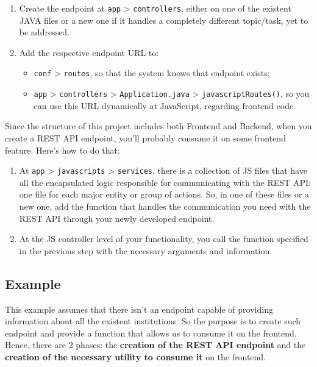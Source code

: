 \documentclass[
  11pt,
]{krantz}
\providecommand{\tightlist}{%
  \setlength{\itemsep}{0pt}\setlength{\parskip}{0pt}}
\begin{document}
\begin{enumerate}
\def\labelenumi{\arabic{enumi}.}
\item
  Create the endpoint at \texttt{app} \textgreater{} \texttt{controllers}, either on one of the existent JAVA files or a new one if it handles a completely different topic/task, yet to be addressed.
\item
  Add the respective endpoint URL to:

  \begin{itemize}
  \tightlist
  \item
    \texttt{conf} \textgreater{} \texttt{routes}, so that the system knows that endpoint exists;
  \item
    \texttt{app} \textgreater{} \texttt{controllers} \textgreater{} \texttt{Application.java} \textgreater{} \texttt{javascriptRoutes()}, so you can use this URL dynamically at JavaScript, regarding frontend code.
  \end{itemize}
\end{enumerate}

Since the structure of this project includes both Frontend and Backend, when you create a REST API endpoint, you'll probably consume it on some frontend feature. Here's how to do that:

\begin{enumerate}
\def\labelenumi{\arabic{enumi}.}
\item
  At \texttt{app} \textgreater{} \texttt{javascripts} \textgreater{} \texttt{services}, there is a collection of JS files that have all the encapsulated logic responsible for communicating with the REST API: one file for each major entity or group of actions. So, in one of these files or a new one, add the function that handles the communication you need with the REST API through your newly developed endpoint.
\item
  At the JS controller level of your functionality, you call the function specified in the previous step with the necessary arguments and information.
\end{enumerate}

\hypertarget{example}{%
\subsection{Example}\label{example}}

This example assumes that there isn't an endpoint capable of providing information about all the existent institutions. So the purpose is to create such endpoint and provide a function that allows us to consume it on the frontend. Hence, there are 2 phases: the \textbf{creation of the REST API endpoint} and the \textbf{creation of the necessary utility to consume it} on the frontend.
\end{document}
